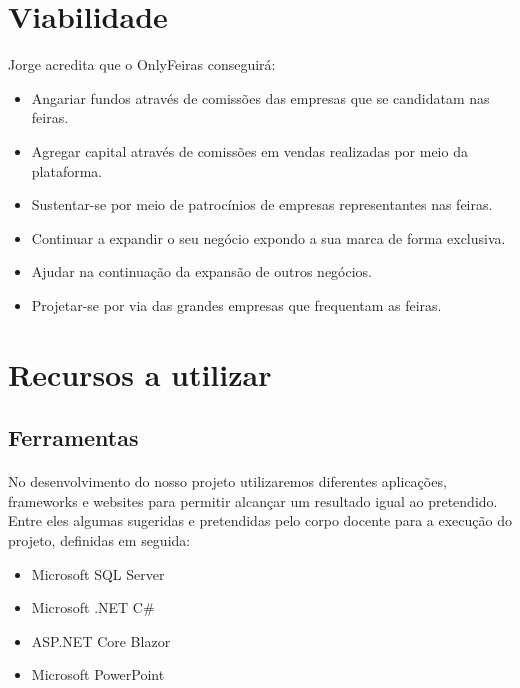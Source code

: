 \documentclass[a4paper,12pt]{scrreprt}
\begin{document}
    \section{Viabilidade}
        Jorge acredita que o OnlyFeiras conseguirá:
        \begin{itemize}
            \item Angariar fundos através de comissões das empresas que se candidatam nas feiras.
            \item Agregar capital através de comissões em vendas realizadas por meio da plataforma.
            \item Sustentar-se por meio de patrocínios de empresas representantes nas feiras.
            \item Continuar a expandir o seu negócio expondo a sua marca de forma exclusiva.
            \item Ajudar na continuação da expansão de outros negócios.
            \item Projetar-se por via das grandes empresas que frequentam as feiras.
        \end{itemize}
    
    \section{Recursos a utilizar}
        \subsection{Ferramentas}
            \paragraph{}
            No desenvolvimento do nosso projeto utilizaremos diferentes aplicações, frameworks e websites para permitir alcançar um resultado igual ao pretendido. Entre eles algumas sugeridas e pretendidas pelo corpo docente para a execução do projeto, definidas em seguida:
            \begin{itemize}
                \item Microsoft SQL Server
                \item Microsoft .NET C\# 
                \item ASP.NET Core Blazor
                \item Microsoft PowerPoint
            \end{itemize}
    
\end{document}
